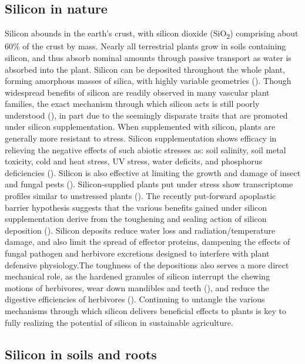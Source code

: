\documentclass[12pt, letterpaper, ]{article}
\begin{document}
\subsection{Silicon in nature}

Silicon abounds in the earth’s crust, with silicon dioxide (SiO\textsubscript{2}) comprising about 60\% of the crust by mass. Nearly all terrestrial plants grow in soils containing silicon, and thus absorb nominal amounts through passive transport as water is absorbed into the plant. Silicon can be deposited throughout the whole plant, forming amorphous masses of silica, with highly variable geometries (\cite{piperno_phytoliths_2006}). Though widespread benefits of silicon are readily observed in many vascular plant families, the exact mechanism through which silicon acts is still poorly understood (\cite{coskun_controversies_2019}), in part due to the seemingly disparate traits that are promoted under silicon supplementation. When supplemented with silicon, plants are generally more resistant to stress. Silicon supplementation shows efficacy in relieving the negative effects of such abiotic stresses as: soil salinity, soil metal toxicity, cold and heat stress, UV stress, water deficits, and phosphorus deficiencies (\cite{cooke_consistent_2016}). Silicon is also effective at limiting the growth and damage of insect and fungal pests (\cite{fauteux_silicon_2005,massey_herbivore_2007}). Silicon-supplied plants put under stress show transcriptome profiles similar to unstressed plants (\cite{coskun_controversies_2019}). The recently put-forward apoplastic barrier hypothesis suggests that the various benefits gained under silicon supplementation derive from the toughening and sealing action of silicon deposition (\cite{coskun_controversies_2019}). Silicon deposits reduce water loss and radiation/temperature damage, and also limit the spread of effector proteins, dampening the effects of fungal pathogen and herbivore excretions designed to interfere with plant defensive physiology.The toughness of the depositions also serves a more direct mechanical role, as the hardened granules of silicon interrupt the chewing motions of herbivores, wear down mandibles and teeth (\cite{stromberg_functions_2016,waterman_short-term_2021-1}), and reduce the digestive efficiencies of herbivores (\cite{johnson_silicon_2021}). Continuing to untangle the various mechanisms through which silicon delivers beneficial effects to plants is key to fully realizing the potential of silicon in sustainable agriculture. 

\subsection{Silicon in soils and roots}
\end{document}
